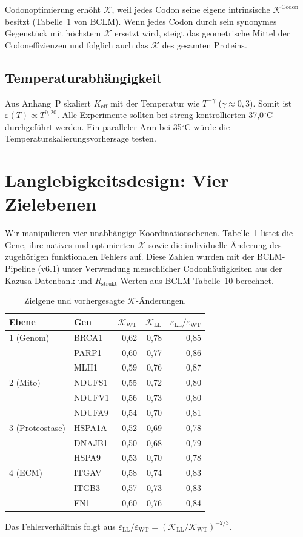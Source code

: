 \documentclass[12pt,a4paper]{article}
\newcommand{\REL}{\mathcal{K}}          %
\begin{document}
	Codonoptimierung erhöht \(\REL\), weil jedes Codon seine eigene intrinsische \(\REL^{\mathrm{Codon}}\) besitzt (Tabelle~1 von BCLM). Wenn jedes Codon durch sein synonymes Gegenstück mit höchstem \(\REL\) ersetzt wird, steigt das geometrische Mittel der Codoneffizienzen und folglich auch das \(\REL\) des gesamten Proteins.
	
	\subsection{Temperaturabhängigkeit}
	Aus Anhang~P skaliert \(K_{\mathrm{eff}}\) mit der Temperatur wie \(T^{-\gamma}\) (\(\gamma\approx0,3\)). Somit ist \(\varepsilon(T) \propto T^{0,20}\). Alle Experimente sollten bei streng kontrollierten 37,0\(^\circ\)C durchgeführt werden. Ein paralleler Arm bei 35\(^\circ\)C würde die Temperaturskalierungsvorhersage testen.
	
	\section{Langlebigkeitsdesign: Vier Zielebenen}
	\label{sec:layers}
	Wir manipulieren vier unabhängige Koordinationsebenen. Tabelle~\ref{tab:targets} listet die Gene, ihre natives und optimierten \(\REL\) sowie die individuelle Änderung des zugehörigen funktionalen Fehlers auf. Diese Zahlen wurden mit der BCLM-Pipeline (v6.1) unter Verwendung menschlicher Codonhäufigkeiten aus der Kazusa-Datenbank und \(R_{\mathrm{strukt}}\)-Werten aus BCLM-Tabelle~10 berechnet.
	
	\begin{table}[H]
		\centering
		\caption{Zielgene und vorhergesagte \(\REL\)-Änderungen.}
		\label{tab:targets}
		\begin{tabular}{@{}llrrr@{}}
			\toprule
			\textbf{Ebene} & \textbf{Gen} & \(\REL_{\mathrm{WT}}\) & \(\REL_{\mathrm{LL}}\) & \(\varepsilon_{\mathrm{LL}}/\varepsilon_{\mathrm{WT}}\) \\
			\midrule
			1 (Genom) & BRCA1 & 0,62 & 0,78 & 0,85 \\
			& PARP1 & 0,60 & 0,77 & 0,86 \\
			& MLH1  & 0,59 & 0,76 & 0,87 \\
			2 (Mito)   & NDUFS1 & 0,55 & 0,72 & 0,80 \\
			& NDUFV1 & 0,56 & 0,73 & 0,80 \\
			& NDUFA9 & 0,54 & 0,70 & 0,81 \\
			3 (Proteostase) & HSPA1A & 0,52 & 0,69 & 0,78 \\
			& DNAJB1 & 0,50 & 0,68 & 0,79 \\
			& HSPA9  & 0,53 & 0,70 & 0,78 \\
			4 (ECM)    & ITGAV  & 0,58 & 0,74 & 0,83 \\
			& ITGB3  & 0,57 & 0,73 & 0,83 \\
			& FN1    & 0,60 & 0,76 & 0,84 \\
			\bottomrule
		\end{tabular}
		\footnotesize Das Fehlerverhältnis folgt aus \(\varepsilon_{\mathrm{LL}}/\varepsilon_{\mathrm{WT}} = (\REL_{\mathrm{LL}}/\REL_{\mathrm{WT}})^{-2/3}\).
	\end{table}
	
\end{document}
